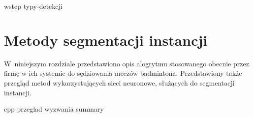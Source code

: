 {wstep}
{typy-detekcji}

\section{Metody segmentacji instancji}
\label{sec:metody_detekcji}

W~niniejszym rozdziale przedstawiono opis alogrytmu stosowanego obecnie przez firmę \blue{} w ich systemie do sędziowania meczów badmintona. Przedstawiony także przegląd metod wykorzystujących sieci neuronowe, służących do segmentacji instancji.

{cpp}
{przeglad}
{wyzwania}
{summary}
